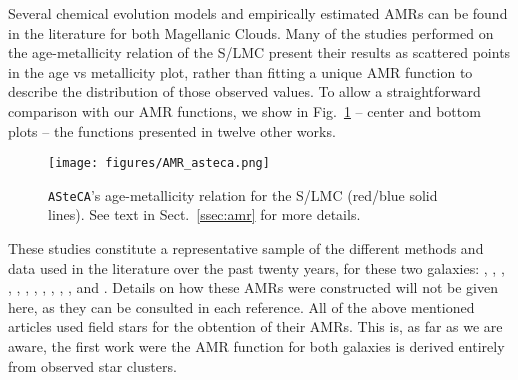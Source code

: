 \documentclass[draft]{aa}
\begin{document}
Several chemical evolution models and empirically estimated AMRs can be found in
the literature for both Magellanic Clouds. Many of the studies performed on the
age-metallicity relation of the S/LMC present their results as scattered points
in the age vs metallicity plot, rather than fitting a unique AMR function to
describe the distribution of those observed values.
%
To allow a straightforward comparison with our AMR functions, we show in
Fig.~\ref{fig:amr} -- center and bottom plots -- the functions presented in
twelve other works.

\begin{figure}
\centering
\texttt{[image: figures/AMR\_asteca.png]}
\caption{\texttt{ASteCA}'s age-metallicity relation for the S/LMC (red/blue
solid lines). 
See text in Sect.~\ref{ssec:amr} for more details.}
\label{fig:amr}
\end{figure}

These studies constitute a representative sample of the different methods and
data used in the literature over the past twenty years, for these two
galaxies:
\citet[][PT98; bursting models]{Pagel_1998}, \citet[][G98; closed-box model
with Holtzman SFH]{Geha_1998}, \citet[][HZ04]{Harris_2004}, \citet[][C08a;
average of four disk frames]{Carrera_2008_lmc}, \citet[][C08b; average of
thirteen frames]{Carrera_2008_smc}, \citet[][HZ09]{Harris_2009}, \citet[][N09;
5th degree polynomial fit to the AMRs of their three observed regions]
{Noel_2009}, \citet[][TB09; 1: no merger model, 2: equal mass merger, 3: one
to four merger]{Tsujimoto_2009}, \citet[][R12; four tiles average]{Rubele_2012},
\citet[][C13; B: Bologna, C: Cole]{Cignoni_2013}, \citet[][PG13]
{Piatti_Geisler_2013}, and \citet[][M14; 0: field LMC0, 1: field LMC1 , 2: field
LMC2]{Meschin_2014}.
Details on how these AMRs were constructed will not be given here, as
they can be consulted in each reference.
%
All of the above mentioned articles used field stars for the obtention
of their AMRs. This is, as far as we are aware, the first work were the AMR
function for both galaxies is derived entirely from observed star clusters.

\end{document}
